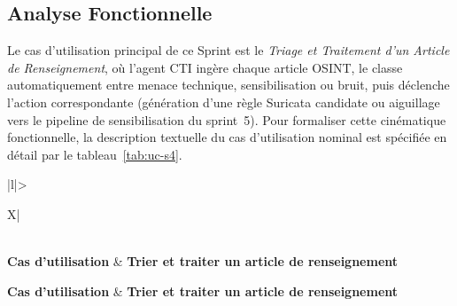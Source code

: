 \subsection{Analyse Fonctionnelle}
Le cas d'utilisation principal de ce Sprint est le \textit{Triage et Traitement d'un Article de Renseignement}, où l'agent \ac{CTI} ingère chaque article \ac{OSINT}, le classe automatiquement entre menace technique, sensibilisation ou bruit, puis déclenche l'action correspondante (génération d'une règle Suricata candidate ou aiguillage vers le pipeline de sensibilisation du sprint~5). Pour formaliser cette cinématique fonctionnelle, la description textuelle du cas d'utilisation nominal est spécifiée en détail par le tableau~\ref{tab:uc-s4}.

\renewcommand{\arraystretch}{1.25}
\small
\begin{xltabular}{\textwidth}{|l|>{\raggedright\arraybackslash}X|}

\caption{Description textuelle du cas d'utilisation « Trier et traiter un article de renseignement ».}
\label{tab:uc-s4} \\

\hline
{}
\textbf{Cas d'utilisation} & \textbf{Trier et traiter un article de renseignement} \\ \hline
\endfirsthead

\hline
{}
\textbf{Cas d'utilisation} & \textbf{Trier et traiter un article de renseignement} \\ \hline
\endhead


\end{xltabular}
